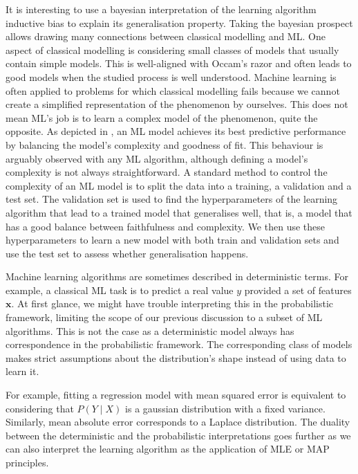 It is interesting to use a bayesian interpretation of the learning algorithm inductive bias to explain its generalisation property. Taking the bayesian prospect allows drawing many connections between classical modelling and ML. One aspect of classical modelling is considering small classes of models that usually contain simple models. This is well-aligned with Occam's razor and often leads to good models when the studied process is well understood. Machine learning is often applied to problems for which classical modelling fails because we cannot create a simplified representation of the phenomenon by ourselves. This does not mean ML's job is to learn a complex model of the phenomenon, quite the opposite. As depicted in , an ML model achieves its best predictive performance by balancing the model's complexity and goodness of fit. This behaviour is arguably observed with any ML algorithm, although defining a model's complexity is not always straightforward. A standard method to control the complexity of an ML model is to split the data into a training, a validation and a test set. The validation set is used to find the hyperparameters of the learning algorithm that lead to a trained model that generalises well, that is, a model that has a good balance between faithfulness and complexity. We then use these hyperparameters to learn a new model with both train and validation sets and use the test set to assess whether generalisation happens. %

Machine learning algorithms are sometimes described in deterministic terms. For example, a classical ML task is to predict a real value $y$ provided a set of features $\bm x$. At first glance, we might have trouble interpreting this in the probabilistic framework, limiting the scope of our previous discussion to a subset of ML algorithms. This is not the case as a deterministic model always has correspondence in the probabilistic framework. The corresponding class of models makes strict assumptions about the distribution's shape instead of using data to learn it.

For example, fitting a regression model with mean squared error is equivalent to considering that $P(Y\mid X)$ is a gaussian distribution with a fixed variance. Similarly, mean absolute error corresponds to a Laplace distribution. The duality between the deterministic and the probabilistic interpretations goes further as we can also interpret the learning algorithm as the application of MLE or MAP principles. %

